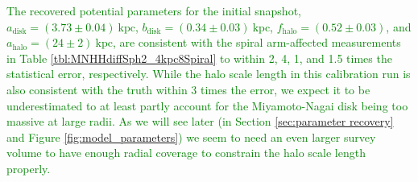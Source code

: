 \documentclass[iop,revtex4,numberedappendix,appendixfloats]{emulateapj}
\newcommand{\NEW}[1]{\textcolor{Green}{#1}}
\begin{document}
\NEW{The recovered potential parameters for the initial snapshot, $a_\text{disk}=(3.73 \pm 0.04) ~\text{kpc}$, $b_\text{disk}=(0.34 \pm 0.03) ~\text{kpc}$, $f_\text{halo}=(0.52 \pm 0.03)$, and $a_\text{halo}=(24 \pm 2) ~\text{kpc}$, are consistent with the spiral arm-affected measurements in Table \ref{tbl:MNHHdiffSph2_4kpc8Spiral} to within 2, 4, 1, and 1.5 times the statistical error, respectively. While the halo scale length in this calibration run is also consistent with the truth within 3 times the error, we expect it to be underestimated to at least partly account for the Miyamoto-Nagai disk being too massive at large radii. As we will see later (in Section \ref{sec:parameter recovery} and Figure \ref{fig:model_parameters}) we seem to need an even larger survey volume to have enough radial coverage to constrain the halo scale length properly.}
\end{document}
